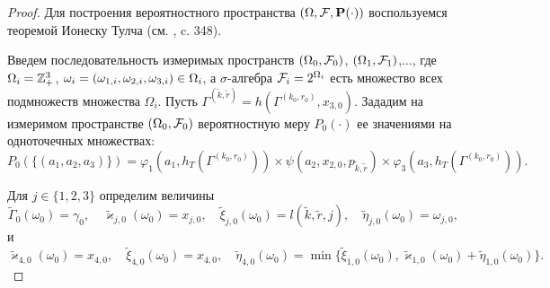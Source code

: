\documentclass[a4paper,12pt,russian]{extarticle}
\begin{document}
\begin{proof}
Для построения вероятностного пространства $(\Omega, {\cal F}, \Pr(\cdot))$ воспользуемся теоремой Ионеску Тулча (см. \cite{Shiryaev}, c. 348). 

Введем последовательность измеримых пространств $(\Omega_0, {\cal F}_0)$, $(\Omega_1, {\cal F}_1)$,$\ldots$, где $\Omega_i\hm=\mathbb{Z}_+^3$, $\omega_i=(\omega_{1,i},\omega_{2,i},\omega_{3,i}) \hm\in \Omega_i$, а $\sigma$-алгебра ${\cal F}_i=2^{\Omega_i}$  есть множество всех подмножеств множества $\Omega_i$. 
Пусть $\Gamma^{(\tilde{k},\tilde{r})}=h(\Gamma^{(k_0,r_0)},x_{3,0})$.
Зададим на измеримом пространстве $(\Omega_0, {\cal F}_0)$ вероятностную меру $P_0(\cdot)$ ее значениями на одноточечных множествах:
\begin{equation}
P_0(\{(a_1,a_2,a_3)\})=\varphi_1(a_1,h_T(\Gamma^{(k_0,r_0)})) \times \psi(a_2,x_{2,0}, p_{\tilde{k},\tilde{r}}) \times \varphi_3(a_3,h_T(\Gamma^{(k_0,r_0)})).
\label{probabilitiesOne}
\end{equation}

Для $j\in \{1,2,3\}$ определим величины
\begin{equation}
\tilde{\Gamma}_0(\omega_0)=\gamma_0, \quad \tilde{\varkappa}_{j,0}(\omega_0)=x_{j,0}, \quad \tilde{\xi}_{j,0}(\omega_0)=l(\tilde{k},\tilde{r},j), \quad \tilde{\eta}_{j,0}(\omega_0)=\omega_{j,0},
\label{startRekOne}
\end{equation}
и
\begin{equation}
 \tilde{\varkappa}_{4,0}(\omega_0)=x_{4,0}, \quad \tilde{\xi}_{4,0}(\omega_0)=x_{4,0}, \quad \tilde{\eta}_{4,0}(\omega_0)=\min\{\tilde{\xi}_{1,0}(\omega_0), \tilde{\varkappa}_{1,0}(\omega_0)+\tilde{\eta}_{1,0}(\omega_0)\}.
\label{startRekTwo}
\end{equation}


\end{proof}
\end{document}
